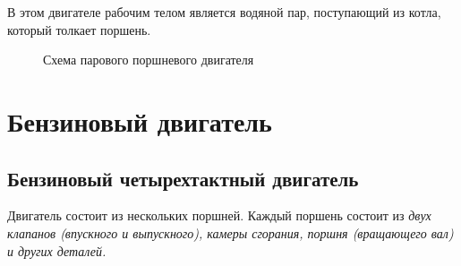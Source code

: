 \documentclass[a4paper,14pt]{article}
\begin{document}
        В этом двигателе рабочим телом является водяной пар, поступающий из котла, который толкает поршень.
        \begin{figure}[h]
            \caption{Схема парового поршневого двигателя}
        \end{figure}

    \pagebreak
    \section{Бензиновый двигатель}
    \subsection{Бензиновый четырехтактный двигатель}

        Двигатель состоит из нескольких поршней. Каждый поршень состоит из \textit{двух клапанов (впускного и выпускного), камеры сгорания, поршня (вращающего вал) и других деталей.}
\end{document}
